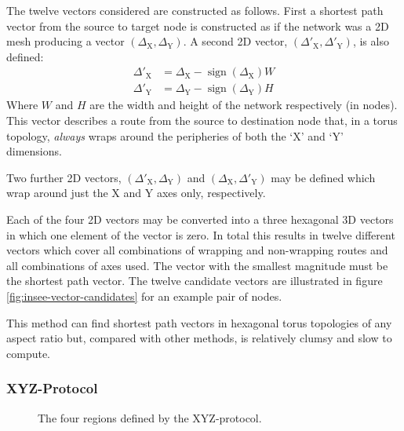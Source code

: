 				The twelve vectors considered are constructed as follows.  First a
				shortest path vector from the source to target node is constructed as if
				the network was a 2D mesh producing a vector
				$(\Delta_\textrm{X},\Delta_\textrm{Y})$. A second 2D vector,
				$(\Delta'_\textrm{X},\Delta'_\textrm{Y})$, is also defined:
				\begin{align*}
					\Delta'_\textrm{X} &= \Delta_\textrm{X} - \operatorname{sign}(\Delta_\textrm{X})W
					\\
					\Delta'_\textrm{Y} &= \Delta_\textrm{Y} - \operatorname{sign}(\Delta_\textrm{Y})H
				\end{align*}
				Where $W$ and $H$ are the width and height of the network respectively
				(in nodes). This vector describes a route from the source to
				destination node that, in a torus topology, \emph{always} wraps around
				the peripheries of both the `X' and `Y' dimensions.
				
				Two further 2D vectors, $(\Delta'_\textrm{X},\Delta_\textrm{Y})$ and
				$(\Delta_\textrm{X},\Delta'_\textrm{Y})$ may be defined which wrap around
				just the X and Y axes only, respectively.
				
				Each of the four 2D vectors may be converted into a three hexagonal 3D
				vectors in which one element of the vector is zero. In total this
				results in twelve different vectors which cover all combinations of
				wrapping and non-wrapping routes and all combinations of axes used. The
				vector with the smallest magnitude must be the shortest path vector.
				The twelve candidate vectors are illustrated in figure
				\ref{fig:insee-vector-candidates} for an example pair of nodes.
				
				This method can find shortest path vectors in hexagonal torus
				topologies of any aspect ratio but, compared with other methods, is
				relatively clumsy and slow to compute.
			
			\subsubsection{XYZ-Protocol}
				
				\begin{figure}
					\center
					
					\caption{The four regions defined by the XYZ-protocol.}
					\label{fig:xyz-protocol-regions}
				\end{figure}
			
